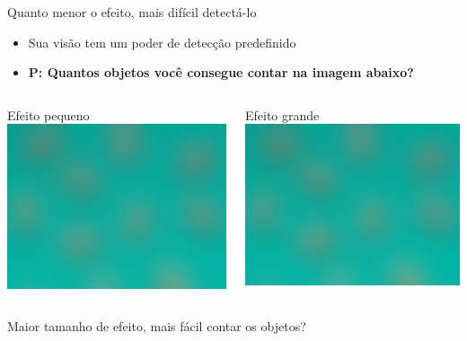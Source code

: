 \documentclass{beamer}
\begin{document}
\begin{frame}{\scriptsize Quanto menor o efeito, mais difícil detectá-lo}
  \begin{itemize}
    \scriptsize
  \item Sua visão tem um poder de detecção predefinido
  \item {\bf P: Quantos objetos você consegue contar na imagem abaixo?}
  \end{itemize}

  \bigskip
  \begin{columns}
    \begin{column}{5cm}
      \begin{exampleblock}{\scriptsize Efeito pequeno}
        \centering
        \includegraphics[width=.35\textwidth]{Cap10-11/analogia-var-poder-var100}
      \end{exampleblock}
    \end{column}
    \begin{column}{5cm}
      \begin{exampleblock}{\scriptsize Efeito grande}
        \centering
        \includegraphics[width=\textwidth]{Cap10-11/analogia-var-poder-var100}
      \end{exampleblock}
    \end{column}
  \end{columns}
  \vfill
  \centering
  \scriptsize
  Maior tamanho de efeito, mais fácil contar os objetos?
\end{frame}
\end{document}
